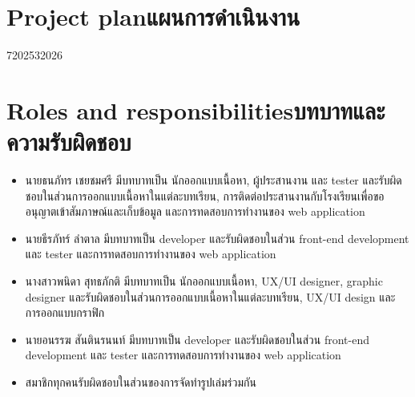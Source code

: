 \section{\ifenglish Project plan\else แผนการดำเนินงาน\fi}

\begin{plan}{7}{2025}{3}{2026}
\end{plan}

\section{\ifenglish Roles and responsibilities\else บทบาทและความรับผิดชอบ\fi}
\begin{itemize}
    \item นายธนภัทร เชยชมศรี มีบทบาทเป็น นักออกแบบเนื้อหา, ผู้ประสานงาน และ tester และรับผิดชอบในส่วนการออกแบบเนื้อหาในแต่ละบทเรียน, 
    การติดต่อประสานงานกับโรงเรียนเพื่อขออนุญาตเข้าสัมภาษณ์และเก็บข้อมูล และการทดสอบการทำงานของ web application
    \item นายธีรภัทร์ ลําตาล มีบทบาทเป็น developer และรับผิดชอบในส่วน front-end development และ tester และการทดสอบการทำงานของ web application
    \item นางสาวพนิดา สุทธภักติ มีบทบาทเป็น นักออกแบบเนื้อหา, UX/UI designer, graphic designer และรับผิดชอบในส่วนการออกแบบเนื้อหาในแต่ละบทเรียน, UX/UI design และการออกแบบกราฟิก
    \item นายอนรรฆ สันตินรนนท์ มีบทบาทเป็น developer และรับผิดชอบในส่วน front-end development และ tester และการทดสอบการทำงานของ web application
    \item สมาชิกทุกคนรับผิดชอบในส่วนของการจัดทำรูปเล่มร่วมกัน
\end{itemize}

